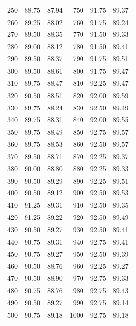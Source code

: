 \documentclass{acm_proc_article-sp}
\begin{document}
\begin{table}[H]
{\begin{tabular}{r r r | r r r}
250 & 88.75 & 87.94 & 750 & 91.75 & 89.37 \\
260 & 89.25 & 88.02 & 760 & 91.75 & 89.24 \\
270 & 89.50 & 88.35 & 770 & 91.50 & 89.33 \\
280 & 89.00 & 88.12 & 780 & 91.50 & 89.41 \\
290 & 89.50 & 88.37 & 790 & 91.75 & 89.51 \\
300 & 89.50 & 88.61 & 800 & 91.75 & 89.47 \\
310 & 89.75 & 88.47 & 810 & 92.25 & 89.47 \\
320 & 90.50 & 88.51 & 820 & 92.00 & 89.59 \\
330 & 89.75 & 88.24 & 830 & 92.50 & 89.49 \\
340 & 89.75 & 88.31 & 840 & 92.00 & 89.55 \\
350 & 89.75 & 88.49 & 850 & 92.75 & 89.57 \\
360 & 89.75 & 88.53 & 860 & 92.50 & 89.57 \\
370 & 89.50 & 88.71 & 870 & 92.25 & 89.37 \\
380 & 90.00 & 88.80 & 880 & 92.25 & 89.33 \\
390 & 90.50 & 89.29 & 890 & 92.25 & 89.51 \\
400 & 90.50 & 89.12 & 900 & 92.50 & 89.53 \\
410 & 91.25 & 89.31 & 910 & 92.50 & 89.35 \\
420 & 91.25 & 89.22 & 920 & 92.50 & 89.49 \\
430 & 90.50 & 89.27 & 930 & 92.50 & 89.41 \\
440 & 90.75 & 89.31 & 940 & 92.75 & 89.41 \\
450 & 90.75 & 89.27 & 950 & 92.50 & 89.39 \\
460 & 90.50 & 88.76 & 960 & 92.25 & 89.27 \\
470 & 90.50 & 88.90 & 970 & 92.75 & 89.33 \\
480 & 90.75 & 88.76 & 980 & 92.75 & 89.43 \\
490 & 90.50 & 89.27 & 990 & 92.75 & 89.14 \\
500 & 90.75 & 89.18 & 1000 & 92.75 & 89.18 \\
\bottomrule
\end{tabular}
}
\end{table}
\end{document}

